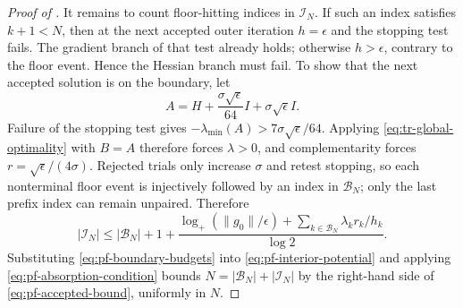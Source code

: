 \documentclass{article}
\begin{document}
\begin{proof}[Proof of ]
It remains to count floor-hitting indices in $\mathcal I_N$.  If such
an index satisfies $k+1<N$, then at the next accepted outer iteration
$h=\epsilon$ and the stopping test fails.  The gradient branch of that
test already holds; otherwise $h>\epsilon$, contrary to the floor
event.  Hence the Hessian branch must fail.  To show that the next
accepted solution is on the boundary, let
\[
 A=H+\frac{\sigma\sqrt\epsilon}{64}I
      +\sigma\sqrt\epsilon I.
\]
Failure of the stopping test gives
$-\lambda_{\min}(A)>7\sigma\sqrt\epsilon/64$.
Applying \eqref{eq:tr-global-optimality} with $B=A$ therefore forces
$\lambda>0$, and complementarity forces
$r=\sqrt\epsilon/(4\sigma)$.
Rejected trials only increase $\sigma$ and retest stopping, so each
nonterminal floor event is injectively followed by an index in
$\mathcal B_N$; only the last prefix index can remain unpaired.
Therefore
\begin{equation}\label{eq:pf-interior-potential}
 |\mathcal I_N|
 \le |\mathcal B_N|+1+
 \frac{
  \log_+(\|g_0\|/\epsilon)
  +\sum_{k\in\mathcal B_N}\lambda_kr_k/h_k
 }{\log2}.
\end{equation}
Substituting \eqref{eq:pf-boundary-budgets} into
\eqref{eq:pf-interior-potential} and applying
\eqref{eq:pf-absorption-condition} bounds
$N=|\mathcal B_N|+|\mathcal I_N|$ by the right-hand side of
\eqref{eq:pf-accepted-bound}, uniformly in $N$.
\end{proof}
\end{document}
